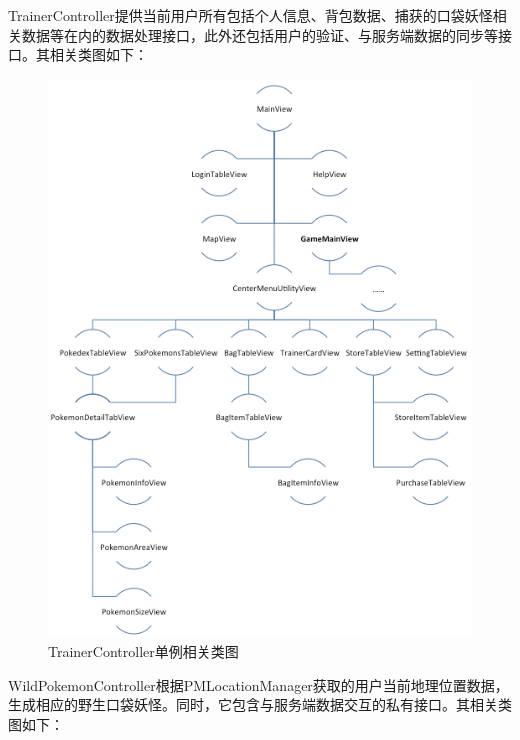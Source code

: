 \documentclass{article}
\begin{document}
\begin{CJK}{UTF8}{gbsn}
  TrainerController提供当前用户所有包括个人信息、背包数据、捕获的口袋妖怪相关数据等在内的数据处理接口，此外还包括用户的验证、与服务端数据的同步等接口。其相关类图如下：

  \begin{figure}[htbp]
		\centering
		\includegraphics[bb=0 0 548 341, scale=0.45]{figure/fig_n10.png}
		\caption{TrainerController单例相关类图}
		\label{fig:n10}
	\end{figure}

  WildPokemonController根据PMLocationManager获取的用户当前地理位置数据，生成相应的野生口袋妖怪。同时，它包含与服务端数据交互的私有接口。其相关类图如下：


\end{CJK}
\end{document}
